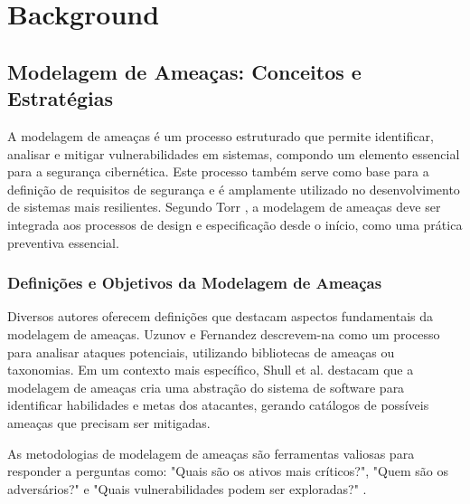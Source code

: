 
%

\chapter{Background}
\label{cha:background}

\glsresetall

\section{Modelagem de Ameaças: Conceitos e Estratégias}
\label{sec:threat_modeling}

A modelagem de ameaças é um processo estruturado que permite identificar,
analisar e mitigar vulnerabilidades em sistemas, compondo um elemento essencial
para a segurança cibernética. Este processo também serve como base para a
definição de requisitos de segurança e é amplamente utilizado no desenvolvimento
de sistemas mais resilientes. Segundo Torr
\cite{DemystifyingTheThreatModelingProcess}, a modelagem de ameaças deve ser
integrada aos processos de design e especificação desde o início, como uma
prática preventiva essencial.

\subsection{Definições e Objetivos da Modelagem de Ameaças}

Diversos autores oferecem definições que destacam aspectos fundamentais da
modelagem de ameaças. Uzunov e Fernandez
\cite{ThreatModelingASystematicLiteratureReview} descrevem-na como um processo
para analisar ataques potenciais, utilizando bibliotecas de ameaças ou
taxonomias. Em um contexto mais específico, Shull et al.
\cite{EvaluationofCompetingThreatModeling} destacam que a modelagem de ameaças
cria uma abstração do sistema de software para identificar habilidades e metas
dos atacantes, gerando catálogos de possíveis ameaças que precisam ser
mitigadas.

As metodologias de modelagem de ameaças são ferramentas valiosas para responder
a perguntas como: "Quais são os ativos mais críticos?", "Quem são os
adversários?" e "Quais vulnerabilidades podem ser exploradas?"
\cite{ThreatModelingAsABasisForSecurityRequirements}.

